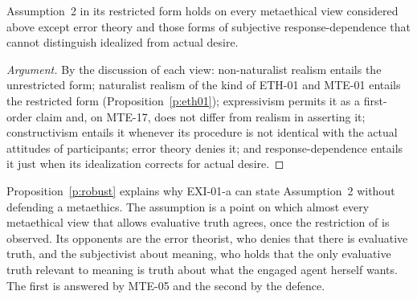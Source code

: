 \begin{proposition}\label{p:robust}
Assumption~2 in its restricted form holds on every metaethical view considered above except error theory and those forms of subjective response-dependence that cannot distinguish idealized from actual desire.
\end{proposition}

\begin{proof}[Argument]
By the discussion of each view: non-naturalist realism entails the unrestricted form; naturalist realism of the kind of ETH-01 and MTE-01 entails the restricted form (Proposition~\ref{p:eth01}); expressivism permits it as a first-order claim and, on MTE-17, does not differ from realism in asserting it; constructivism entails it whenever its procedure is not identical with the actual attitudes of participants; error theory denies it; and response-dependence entails it just when its idealization corrects for actual desire.
\end{proof}

Proposition~\ref{p:robust} explains why EXI-01-a can state Assumption~2 without defending a metaethics. The assumption is a point on which almost every metaethical view that allows evaluative truth agrees, once the restriction of  is observed. Its opponents are the error theorist, who denies that there is evaluative truth, and the subjectivist about meaning, who holds that the only evaluative truth relevant to meaning is truth about what the engaged agent herself wants. The first is answered by MTE-05 and the second by the defence.
